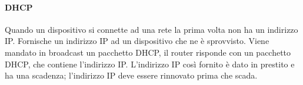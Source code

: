 \documentclass{article}
\begin{document}
\paragraph{DHCP}
Quando un dispositivo si connette ad una rete la prima volta non ha un indirizzo
IP. Fornische un indirizzo IP ad un dispositivo che ne è sprovvisto. Viene 
mandato in broadcast un pacchetto DHCP, il router risponde con un pacchetto 
DHCP, che contiene l'indirizzo IP. L'indirizzo IP così fornito è dato in 
prestito e ha una scadenza; l'indirizzo IP deve essere rinnovato prima che 
scada.\\ 
\end{document}
